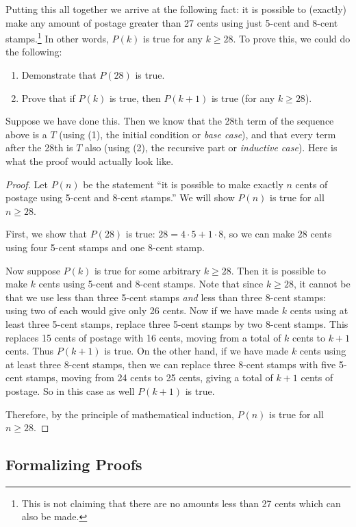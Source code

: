 \documentclass[12pt]{article}
\begin{document}
Putting this all together we arrive at the following fact: it is possible to (exactly) make any amount of postage greater than 27 cents using just 5-cent and 8-cent stamps.\footnote{This is not claiming that there are no amounts less than 27 cents which can also be made.}  In other words, $P(k)$ is true for any $k \ge 28$.  To prove this, we could do the following: 

\begin{enumerate}
  \item Demonstrate that $P(28)$ is true.
  \item Prove that if $P(k)$ is true, then $P(k+1)$ is true (for any $k \ge 28$).
\end{enumerate}
  
Suppose we have done this.  Then we know that the 28th term of the sequence above is a $T$ (using (1), the initial condition or {\em base case}), and that every term after the 28th is $T$ also (using (2), the recursive part or {\em inductive case}).  Here is what the proof would actually look like.

\begin{proof}
  Let $P(n)$ be the statement ``it is possible to make exactly $n$ cents of postage using 5-cent and 8-cent stamps.''  We will show $P(n)$ is true for all $n \ge 28$.
  
  First, we show that $P(28)$ is true: $28 =  4 \cdot 5+ 1\cdot 8$, so we can make $28$ cents using four 5-cent stamps and one 8-cent stamp.  
  
  Now suppose $P(k)$ is true for some arbitrary $k \ge 28$.  Then it is possible to make $k$ cents using 5-cent and 8-cent stamps.  Note that since $k \ge 28$, it cannot be that we use less than three 5-cent stamps {\em and} less than three 8-cent stamps: using two of each would give only 26 cents.  Now if we have made $k$ cents using at least three 5-cent stamps, replace three 5-cent stamps by two 8-cent stamps.  This replaces 15 cents of postage with 16 cents, moving from a total of $k$ cents to $k+1$ cents.  Thus $P(k+1)$ is true.  On the other hand, if we have made $k$ cents using at least three 8-cent stamps, then we can replace three 8-cent stamps with five 5-cent stamps, moving from 24 cents to 25 cents, giving a total of $k+1$ cents of postage.  So in this case as well $P(k+1)$ is true.  
  
  Therefore, by the principle of mathematical induction, $P(n)$ is true for all $n \ge 28$.
\end{proof}


\subsection{Formalizing Proofs}
\end{document}

